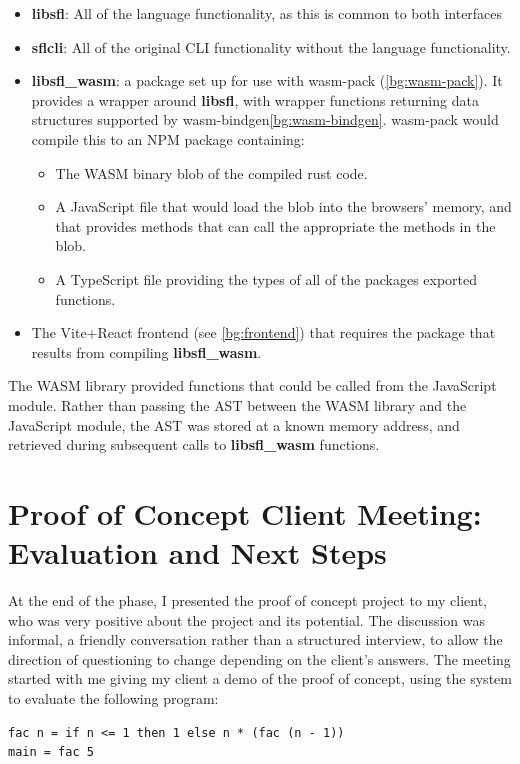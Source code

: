 \begin{itemize}
    \item \textbf{libsfl}: All of the language functionality, as this is common to both interfaces
    \item \textbf{sflcli}: All of the original CLI functionality without the language functionality.  
    \item \textbf{libsfl\_wasm}: a package set up for use with wasm-pack (\ref{bg:wasm-pack}). It provides a wrapper around \textbf{libsfl}, with wrapper functions returning data structures supported by wasm-bindgen\ref{bg:wasm-bindgen}. wasm-pack would compile this to an \ac{NPM} package containing:
    \begin{itemize}
        \item The WASM binary blob of the compiled rust code.
        \item A JavaScript file that would load the blob into the browsers' memory, and that provides methods that can call the appropriate the methods in the blob.
        \item A TypeScript file providing the types of all of the packages exported functions. 
    \end{itemize}
    \item The Vite+React frontend (see \ref{bg:frontend}) that requires the package that results from compiling \textbf{libsfl\_wasm}.
\end{itemize}

The \ac{WASM} library provided functions that could be called from the JavaScript module. Rather than passing the \ac{AST} between the \ac{WASM} library and the JavaScript module, the \ac{AST} was stored at a known memory address, and retrieved during subsequent calls to \textbf{libsfl\_wasm} functions. 

\section{Proof of Concept Client Meeting: Evaluation and \newline Next Steps}
\label{eval:c1_client}
At the end of the phase, I presented the proof of concept project to my client, who was very positive about the project and its potential. The discussion was informal, a friendly conversation rather than a structured interview, to allow the direction of questioning to change depending on the client's answers. The meeting started with me giving my client a demo of the proof of concept, using the system to evaluate the following program:
\begin{lstlisting}[language=SFL]
fac n = if n <= 1 then 1 else n * (fac (n - 1))
main = fac 5
\end{lstlisting}

